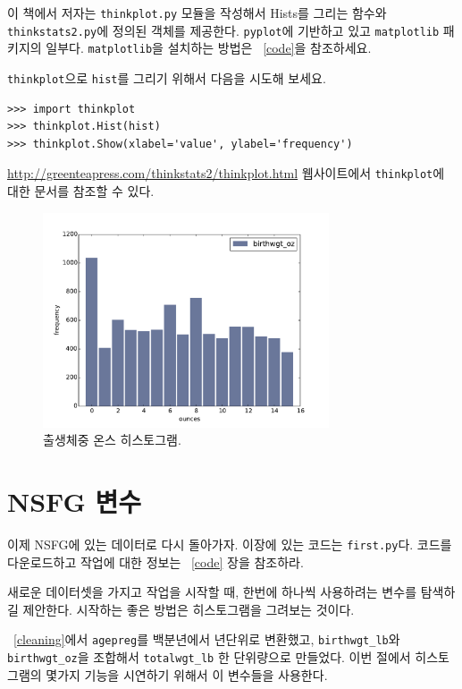 이 책에서 저자는 {\tt thinkplot.py} 모듈을 작성해서 Hists를 그리는 함수와 
{\tt thinkstats2.py}에 정의된 객체를 제공한다. {\tt pyplot}에 기반하고 있고 
{\tt matplotlib} 패키지의 일부다. 
{\tt matplotlib}을 설치하는 방법은 ~\ref{code}을 참조하세요.


{\tt thinkplot}으로 {\tt hist}를 그리기 위해서 다음을 시도해 보세요.


\begin{verbatim}
>>> import thinkplot
>>> thinkplot.Hist(hist)
>>> thinkplot.Show(xlabel='value', ylabel='frequency')
\end{verbatim}

\url{http://greenteapress.com/thinkstats2/thinkplot.html} 웹사이트에서
{\tt thinkplot}에 대한 문서를 참조할 수 있다.

\begin{figure}
\centerline{\includegraphics[height=2.5in]{figs/first_wgt_oz_hist.pdf}}
\caption{출생체중 온스 히스토그램.}
\label{first_wgt_oz_hist}
\end{figure}


\section{NSFG 변수}

이제 NSFG에 있는 데이터로 다시 돌아가자. 이장에 있는 코드는 {\tt first.py}다. 
코드를 다운로드하고 작업에 대한 정보는 ~\ref{code} 장을 참조하라.

새로운 데이터셋을 가지고 작업을 시작할 때, 한번에 하나씩 사용하려는 변수를 탐색하길 제안한다. 
시작하는 좋은 방법은 히스토그램을 그려보는 것이다.



~\ref{cleaning}에서 {\tt agepreg}를 백분년에서 년단위로 변환했고,
\verb"birthwgt_lb"와 \verb"birthwgt_oz"을 조합해서 \verb"totalwgt_lb" 한 단위량으로 만들었다.
이번 절에서 히스토그램의 몇가지 기능을 시연하기 위해서 이 변수들을 사용한다.


